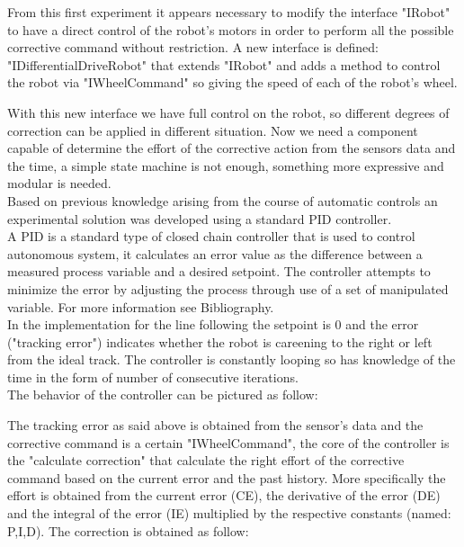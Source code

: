 \documentclass{llncs}
\begin{document}
From this first experiment it appears necessary to modify the interface "IRobot" to have a direct control of the robot's motors in order to perform all the possible corrective command without restriction. A new interface is defined: "IDifferentialDriveRobot" that extends "IRobot" and adds a method to control the robot via "IWheelCommand" so giving the speed of each of the robot's wheel.

\noindent With this new interface we  have full control on the robot, so different degrees of correction can be applied in different situation. Now we need a component capable of determine the effort of the corrective action from the sensors data and the time, a simple state machine is not enough, something more expressive and modular is needed.\\
Based on previous knowledge arising from the course of automatic controls an experimental solution was developed using a standard PID controller.\\
A PID is a standard type of closed chain controller that is used to control autonomous system, it calculates an error value as the difference between a measured process variable and a desired setpoint. The controller attempts to minimize the error by adjusting the process through use of a set of manipulated variable. For more information see Bibliography.\\
In the implementation for the line following the setpoint is 0 and the error ("tracking error") indicates whether the robot is careening to the right or left from the ideal track. The controller is constantly looping so has knowledge of the time in the form of number of consecutive iterations.\\
The behavior of the controller can be pictured as follow:
\begin{center}
\end{center}
\noindent The tracking error as said above is obtained from the sensor's data and the corrective command is a certain "IWheelCommand", the core of the controller is the "calculate correction" that calculate the right effort of the corrective command based on the current error and the past history. More specifically the effort is obtained from the current error (CE), the derivative of the error (DE) and the integral of the error (IE) multiplied by the respective constants (named: P,I,D). The correction is obtained as follow:\\
\end{document}

